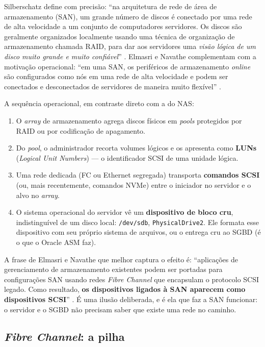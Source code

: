 \documentclass[11pt,a4paper]{article}
\begin{document}
Silberschatz define com precisão: ``na arquitetura de rede de área de armazenamento (SAN), um
grande número de discos é conectado por uma rede de alta velocidade a um conjunto de computadores
servidores. Os discos são geralmente organizados localmente usando uma técnica de organização de
armazenamento chamada RAID, para dar aos servidores uma \emph{visão lógica de um disco muito
grande e muito confiável}'' \cite{silberschatz2020}. Elmasri e Navathe complementam com a
motivação operacional: ``em uma SAN, os periféricos de armazenamento \textit{online} são
configurados como nós em uma rede de alta velocidade e podem ser conectados e desconectados de
servidores de maneira muito flexível'' \cite{elmasri2018}.

A sequência operacional, em contraste direto com a do NAS:

\begin{enumerate}[leftmargin=0.9cm,itemsep=2pt]
\item O \textit{array} de armazenamento agrega discos físicos em \textit{pools} protegidos por
      RAID ou por codificação de apagamento.
\item Do \textit{pool}, o administrador recorta volumes lógicos e os apresenta como \textbf{LUNs}
      (\textit{Logical Unit Numbers}) --- o identificador SCSI de uma unidade lógica.
\item Uma rede dedicada (FC ou Ethernet segregada) transporta \textbf{comandos SCSI} (ou, mais
      recentemente, comandos NVMe) entre o iniciador no servidor e o alvo no \textit{array}.
\item O sistema operacional do servidor vê um \textbf{dispositivo de bloco cru}, indistinguível de
      um disco local: \texttt{/dev/sdb}, \texttt{PhysicalDrive2}. Ele formata esse dispositivo com
      seu próprio sistema de arquivos, ou o entrega cru ao SGBD (é o que o Oracle ASM faz).
\end{enumerate}

A frase de Elmasri e Navathe que melhor captura o efeito é: ``aplicações de gerenciamento de
armazenamento existentes podem ser portadas para configurações SAN usando redes \textit{Fibre
Channel} que encapsulam o protocolo SCSI legado. Como resultado, \textbf{os dispositivos ligados à
SAN aparecem como dispositivos SCSI}'' \cite{elmasri2018}. É uma ilusão deliberada, e é ela que faz
a SAN funcionar: o servidor e o SGBD não precisam saber que existe uma rede no caminho.

\subsection{\textit{Fibre Channel}: a pilha}
\label{sec:fc}
\end{document}
